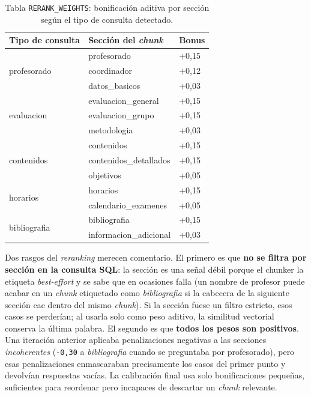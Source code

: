 \begin{table}[hbtp]
\centering
\small
\caption{Tabla \texttt{RERANK\_WEIGHTS}: bonificación aditiva por sección según el tipo de consulta detectado.}\label{tab:rerank-weights}
\begin{tabular}{|p{2.6cm}|p{4.6cm}|p{1.6cm}|}
\hline
\textbf{Tipo de consulta} & \textbf{Sección del \textit{chunk}} & \textbf{Bonus} \\ \hline
\multirow{3}{*}{profesorado} & profesorado & +0,15 \\
                              & coordinador & +0,12 \\
                              & datos\_basicos & +0,03 \\ \hline
\multirow{3}{*}{evaluacion}   & evaluacion\_general & +0,15 \\
                              & evaluacion\_grupo & +0,15 \\
                              & metodologia & +0,03 \\ \hline
\multirow{3}{*}{contenidos}   & contenidos & +0,15 \\
                              & contenidos\_detallados & +0,15 \\
                              & objetivos & +0,05 \\ \hline
\multirow{2}{*}{horarios}     & horarios & +0,15 \\
                              & calendario\_examenes & +0,05 \\ \hline
\multirow{2}{*}{bibliografia} & bibliografia & +0,15 \\
                              & informacion\_adicional & +0,03 \\ \hline
\end{tabular}
\end{table}

Dos rasgos del \textit{reranking} merecen comentario. El primero es que \textbf{no se filtra por sección en la consulta SQL}: la sección es una señal débil porque el chunker la etiqueta \textit{best-effort} y se sabe que en ocasiones falla (un nombre de profesor puede acabar en un \textit{chunk} etiquetado como \textit{bibliografia} si la cabecera de la siguiente sección cae dentro del mismo \textit{chunk}). Si la sección fuese un filtro estricto, esos casos se perderían; al usarla solo como peso aditivo, la similitud vectorial conserva la última palabra. El segundo es que \textbf{todos los pesos son positivos}. Una iteración anterior aplicaba penalizaciones negativas a las secciones \textit{incoherentes} (\texttt{-0,30} a \textit{bibliografia} cuando se preguntaba por profesorado), pero esas penalizaciones enmascaraban precisamente los casos del primer punto y devolvían respuestas vacías. La calibración final usa solo bonificaciones pequeñas, suficientes para reordenar pero incapaces de descartar un \textit{chunk} relevante.

